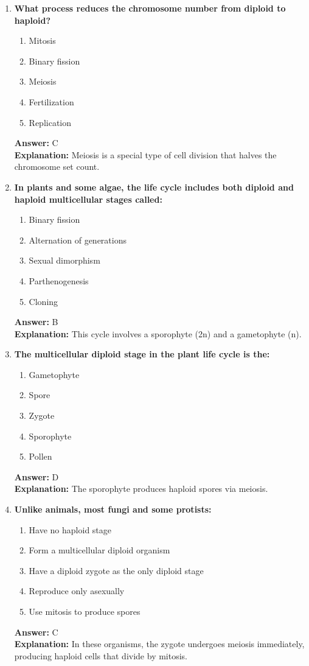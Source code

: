 \documentclass[11pt, a4paper]{article}
\begin{document}
\begin{enumerate}[leftmargin=*, label=\arabic*.]
\item \textbf{What process reduces the chromosome number from diploid to haploid?}
\begin{enumerate}[label=\Alph*.]
\item Mitosis
\item Binary fission
\item Meiosis
\item Fertilization
\item Replication
\end{enumerate}
\textbf{Answer:} C \\
\textbf{Explanation:} Meiosis is a special type of cell division that halves the chromosome set count.

\item \textbf{In plants and some algae, the life cycle includes both diploid and haploid multicellular stages called:}
\begin{enumerate}[label=\Alph*.]
\item Binary fission
\item Alternation of generations
\item Sexual dimorphism
\item Parthenogenesis
\item Cloning
\end{enumerate}
\textbf{Answer:} B \\
\textbf{Explanation:} This cycle involves a sporophyte (2n) and a gametophyte (n).

\item \textbf{The multicellular diploid stage in the plant life cycle is the:}
\begin{enumerate}[label=\Alph*.]
\item Gametophyte
\item Spore
\item Zygote
\item Sporophyte
\item Pollen
\end{enumerate}
\textbf{Answer:} D \\
\textbf{Explanation:} The sporophyte produces haploid spores via meiosis.

\item \textbf{Unlike animals, most fungi and some protists:}
\begin{enumerate}[label=\Alph*.]
\item Have no haploid stage
\item Form a multicellular diploid organism
\item Have a diploid zygote as the only diploid stage
\item Reproduce only asexually
\item Use mitosis to produce spores
\end{enumerate}
\textbf{Answer:} C \\
\textbf{Explanation:} In these organisms, the zygote undergoes meiosis immediately, producing haploid cells that divide by mitosis.


\end{enumerate}
\end{document}
